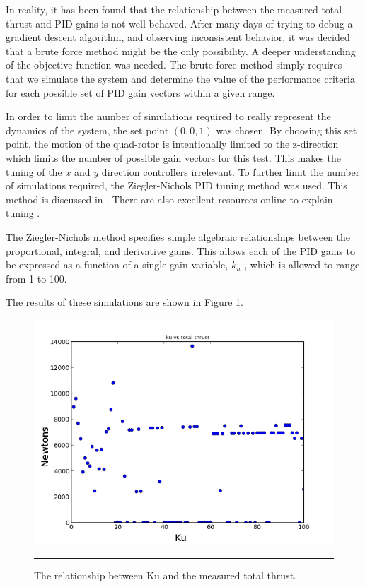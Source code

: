 In reality, it has been found that the relationship between the measured total thrust and PID gains is not well-behaved. After many days of trying to debug a gradient descent algorithm, and observing inconsistent behavior, it was decided that a brute force method might be the only possibility. A deeper understanding of the objective function was needed. The brute force method simply requires that we simulate the system and determine the value of the performance criteria for each possible set of PID gain vectors within a given range.

In order to limit the number of simulations required to really represent the dynamics of the system, the set point $(0,0,1)$ was chosen. By choosing this set point, the motion of the quad-rotor is intentionally limited to the z-direction which limits the number of possible gain vectors for this test. This makes the tuning of the $x$ and $y$ direction controllers irrelevant. To further limit the number of simulations required, the Ziegler-Nichols PID tuning method was used. This method is discussed in \cite{ziegler1942optimum}. There are also excellent resources online to explain tuning \cite{znw:2014:Online}.

The Ziegler-Nichols method specifies simple algebraic relationships between the proportional, integral, and derivative gains. This allows each of the PID gains to be expressed as a function of a single gain variable, $k_u$ , which is allowed to range from 1 to 100.

 The results of these simulations are shown in Figure \ref{fig:Ku vs Thrust}.
\begin{figure}[htbp]
	\centering
		\includegraphics{Figures/kuvsthrust.png}
		\rule{35em}{0.5pt}
	\caption[Ku vs Thrust]{The relationship between Ku and the measured total thrust.}
	\label{fig:Ku vs Thrust}
\end{figure}


